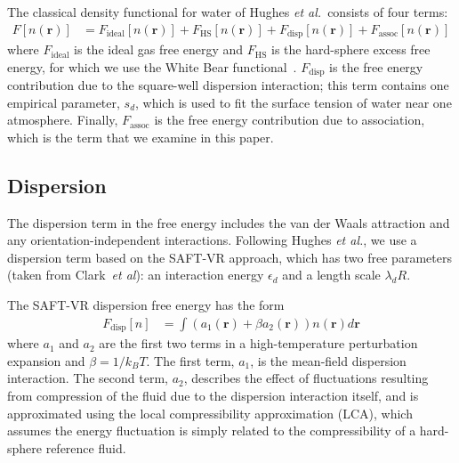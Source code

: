 \documentclass[twocolumn,amsmath,amssymb,prl]{revtex4-1}
\newcommand{\rr}{\textbf{r}}
\newcommand{\xx}{\textbf{r}}
\newcommand\epsilondisp{\ensuremath{\epsilon_\textit{d}}}
\newcommand\lambdadisp{\ensuremath{\lambda_\textit{d}}}
\newcommand\lscale{\ensuremath{s_d}}
\newcommand\hughesetal{Hughes \emph{et al.}}
\begin{document}
The classical density functional for water of \hughesetal\ consists of
four terms:
\begin{align}
  F[n(\rr)] &= F_{\text{ideal}}[n(\rr)] + F_{\text{HS}}[n(\rr)]
  + F_{\text{disp}}[n(\rr)] + F_{\text{assoc}}[n(\rr)]
\end{align}
where $F_{\text{ideal}}$ is the ideal gas free energy and
$F_{\text{HS}}$ is the hard-sphere excess free energy, for which we
use the White Bear functional~\cite{roth2002whitebear}.
$F_{\text{disp}}$ is the free energy contribution due to the
square-well dispersion interaction; this term contains one empirical
parameter, $\lscale$, which is used to fit the surface tension of water near one
atmosphere.  Finally, $F_{\text{assoc}}$ is the free energy
contribution due to association, which is the term that we examine in
this paper.

\subsection{Dispersion}
The dispersion term in the free energy includes the van
der Waals attraction and any orientation-independent
interactions. Following \hughesetal, we use a dispersion term based on
the SAFT-VR approach\cite{gil-villegas-1997-SAFT-VR}, which has two
free parameters (taken from Clark~\emph{et
  al}\cite{clark2006developing}): an interaction energy $\epsilondisp$
and a length scale $\lambdadisp R$.

The SAFT-VR dispersion free energy has the form~\cite{gil-villegas-1997-SAFT-VR}
\begin{align}
  F_\text{disp}[n] &= \int \left(a_1(\xx) + \beta a_2(\xx)\right)n(\xx)d\xx
  \label{eq:dispersion-term}
\end{align}
where $a_1$ and $a_2$ are the first two terms in a high-temperature
perturbation expansion and $\beta=1/k_BT$.  The first term, $a_1$, is 
the mean-field dispersion interaction. The second term, $a_2$, describes the
effect of fluctuations resulting from compression of the fluid due
to the dispersion interaction itself, and is approximated
using the local compressibility approximation (LCA), which
assumes the energy fluctuation is simply related to the
compressibility of a hard-sphere reference fluid\cite{barker1976liquid}.
\end{document}
